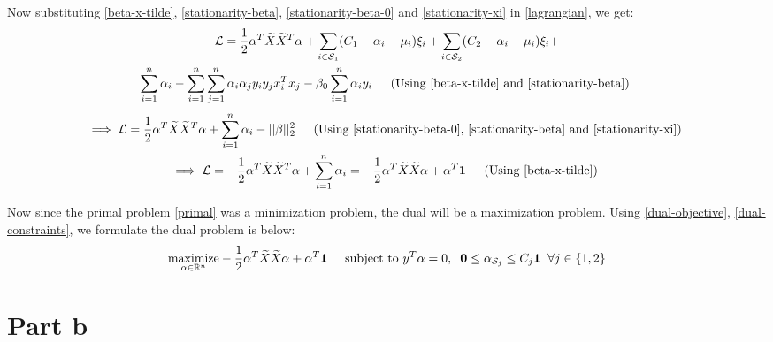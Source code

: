 \documentclass{article}
\newcommand{\xtilde}{\widetilde{X}}
\newcommand{\setS}{\mathcal{S}}
\newcommand{\real}{\mathbb{R}}
\newcommand{\lagL}{\mathcal{L}}
\newcommand{\maximize}{\mathop{\mathrm{maximize}}}
\newcommand{\maximizewrt}[1]{\underset{#1}{\maximize}}
\begin{document}
\begin{flushleft}
Now substituting \ref{beta-x-tilde}, \ref{stationarity-beta}, \ref{stationarity-beta-0} and \ref{stationarity-xi} in \ref{lagrangian}, we get:
\begin{multline}
\displaystyle \lagL = \frac{1}{2}\alpha^{T}\xtilde\xtilde^{T}\alpha + \sum_{i\in\setS_{1}} (C_{1} - \alpha_{i} - \mu_{i})\xi_{i} + \sum_{i\in\setS_{2}} (C_{2} - \alpha_{i} - \mu_{i})\xi_{i} + \\\sum_{i=1}^{n} \alpha_{i} - \sum_{i=1}^{n}\sum_{j=1}^{n}\alpha_{i}\alpha_{j} y_{i}y_{j} x_{i}^{T}x_{j} - \beta_{0}\sum_{i=1}^{n}\alpha_{i}y_{i} \hspace{4mm} \text{ (Using \ref{beta-x-tilde} and \ref{stationarity-beta}) }
\end{multline}
\begin{gather}
\displaystyle \implies \lagL = \frac{1}{2}\alpha^{T}\xtilde\xtilde^{T}\alpha + \sum_{i=1}^{n} \alpha_{i} - ||\beta||_{2}^{2} \hspace{4mm} \text{ (Using \ref{stationarity-beta-0}, \ref{stationarity-beta} and \ref{stationarity-xi}) } \\
\label{dual-objective}
\displaystyle \implies \lagL = -\frac{1}{2}\alpha^{T}\xtilde\xtilde^{T}\alpha + \sum_{i=1}^{n} \alpha_{i} = -\frac{1}{2}\alpha^{T}\xtilde\xtilde\alpha + \alpha^{T}\mathbf{1} \hspace{4mm} \text{ (Using \ref{beta-x-tilde}) }
\end{gather}

Now since the primal problem \ref{primal} was a minimization problem, the dual will be a maximization problem. Using \ref{dual-objective}, \ref{dual-constraints}, we formulate the dual problem is below:
\begin{equation}
\label{dual}
\maximizewrt{\alpha \in \real^{n}} -\frac{1}{2}\alpha^{T}\xtilde\xtilde\alpha + \alpha^{T}\mathbf{1} \hspace{5mm}
\text{subject to } y^{T}\alpha = 0, \hspace{2mm} \mathbf{0} \leq \alpha_{\setS_{j}} \leq C_{j}\mathbf{1} \hspace{2mm} \forall j \in \{1, 2\}
\end{equation}

\end{flushleft}

\section*{Part b}
\end{document}
